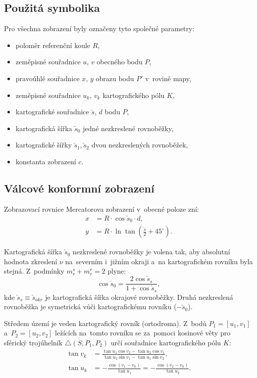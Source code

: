 \documentclass[11pt, a4paper]{article}
\begin{document}
\subsection{Použitá symbolika}

Pro všechna zobrazení byly označeny tyto společné parametry:
\begin{itemize}
    \item poloměr referenční koule $R$,
    \item zeměpisné souřadnice $u$, $v$ obecného bodu $P$,
    \item pravoúhlé souřadnice $x$, $y$ obrazu bodu $P'$ v~rovině mapy,
    \item zeměpisné souřadnice $u_k$, $v_k$ kartografického pólu $K$,
    \item kartografické souřadnice $\check{s}$, $d$ bodu $P$,
    \item kartografická šířka $\check{s}_0$ jedné nezkreslené rovnoběžky,
    \item kartografické šířky $\check{s}_1, \check{s}_2$ dvou nezkreslených rovnoběžek,
    \item konstanta zobrazení $c$.
\end{itemize}

\subsection{Válcové konformní zobrazení}

Zobrazovací rovnice Mercatorova zobrazení v~obecné poloze zní:
\begin{align}
    x &= R \cdot \cos \check{s}_0 \cdot d,\\
    y &= R \cdot \ln \tan\!\left( \tfrac{\check{s}}{2} + 45^{\circ}\right).
\end{align}

Kartografická šířka $\check{s}_0$ nezkreslené rovnoběžky je volena tak, aby absolutní hodnota zkreslení $\nu$ na~severním i~jižním okraji a~na kartografickém rovníku byla stejná. Z~podmínky $m_r^s + m_r^r = 2$ plyne:
\begin{equation}
    \cos \check{s}_0 = \frac{2 \cos \check{s}_s}{1 + \cos \check{s}_s},
\end{equation}
kde $\check{s}_s \equiv \check{s}_{okr}$ je kartografická šířka okrajové rovnoběžky. Druhá nezkreslená rovnoběžka je symetrická vůči kartografickému rovníku ($-\check{s}_0$).

Středem území je veden kartografický rovník (ortodroma). Z~bodů $P_1 = [u_1, v_1]$ a~$P_2 = [u_2, v_2]$ ležících na~tomto rovníku se za~pomoci kosinové věty pro sférický trojúhelník $\triangle(S, P_1, P_2)$ určí souřadnice kartografického pólu $K$:
\begin{align}
    \tan v_k &= \frac{\tan u_1 \cos v_2 - \tan u_2 \cos v_1}{\tan u_2 \sin v_1 - \tan u_1 \sin v_2},\\
    \tan u_k &= -\frac{\cos(v_1 - v_k)}{\tan u_1} = -\frac{\cos(v_2 - v_k)}{\tan u_2}.
\end{align}
\end{document}
